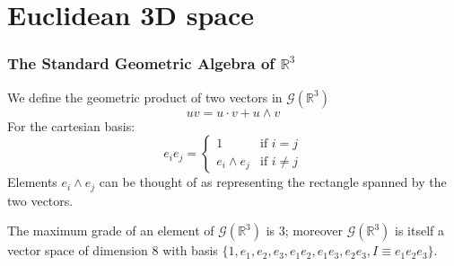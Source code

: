 \documentclass{beamer}
\newcommand{\R}{\mathbb{R}}
\newcommand{\G}{\mathcal{G}}
\begin{document}
\section{Euclidean 3D space}
\setlength{\belowdisplayskip}{0pt}
\setlength{\abovedisplayskip}{0pt}
\begin{frame}
\frametitle{The Standard Geometric Algebra of $\R^3$}
We define the geometric product of two vectors in $\G(\R^3)$
\[ uv = u \cdot v + u\wedge v\]
For the cartesian basis:
\[
    e_ie_j = \begin{cases}
        1 &\text{if\ } i=j\\
        e_i\wedge e_j &\text{if\ } i \neq j
    \end{cases}
\]
Elements $e_i\wedge e_j$ can be thought of as representing the rectangle spanned by the two vectors.
\begin{theorem}
    The maximum grade of an element of $\G(\R^3)$ is 3; moreover $\G(\R^3)$ is itself a vector space of dimension 8 with basis $\{1, e_1, e_2, e_3, e_1e_2, e_1e_3, e_2e_3, I\equiv e_1e_2e_3\}$.
\end{theorem}
\end{frame}
\setlength{\belowdisplayskip}{\baselineskip}
\setlength{\abovedisplayskip}{\baselineskip}

    
    
    
\end{document}
